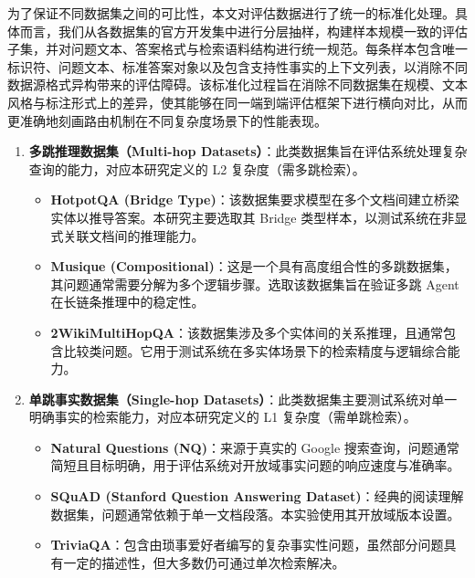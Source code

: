 为了保证不同数据集之间的可比性，本文对评估数据进行了统一的标准化处理。具体而言，我们从各数据集的官方开发集中进行分层抽样，构建样本规模一致的评估子集，并对问题文本、答案格式与检索语料结构进行统一规范。每条样本包含唯一标识符、问题文本、标准答案对象以及包含支持性事实的上下文列表，以消除不同数据源格式异构带来的评估障碍。该标准化过程旨在消除不同数据集在规模、文本风格与标注形式上的差异，使其能够在同一端到端评估框架下进行横向对比，从而更准确地刻画路由机制在不同复杂度场景下的性能表现。


\begin{enumerate}
\item \textbf{多跳推理数据集（Multi-hop Datasets）}：此类数据集旨在评估系统处理复杂查询的能力，对应本研究定义的 L2 复杂度（需多跳检索）。
\begin{itemize}
\item \textbf{HotpotQA (Bridge Type)}：该数据集要求模型在多个文档间建立桥梁实体以推导答案。本研究主要选取其 Bridge 类型样本，以测试系统在非显式关联文档间的推理能力。
\item \textbf{Musique (Compositional)}：这是一个具有高度组合性的多跳数据集，其问题通常需要分解为多个逻辑步骤。选取该数据集旨在验证多跳 Agent 在长链条推理中的稳定性。
\item \textbf{2WikiMultiHopQA}：该数据集涉及多个实体间的关系推理，且通常包含比较类问题。它用于测试系统在多实体场景下的检索精度与逻辑综合能力。
\end{itemize}
\item \textbf{单跳事实数据集（Single-hop Datasets）}：此类数据集主要测试系统对单一明确事实的检索能力，对应本研究定义的 L1 复杂度（需单跳检索）。
\begin{itemize}
    \item \textbf{Natural Questions (NQ)}：来源于真实的 Google 搜索查询，问题通常简短且目标明确，用于评估系统对开放域事实问题的响应速度与准确率。
    \item \textbf{SQuAD (Stanford Question Answering Dataset)}：经典的阅读理解数据集，问题通常依赖于单一文档段落。本实验使用其开放域版本设置。
    \item \textbf{TriviaQA}：包含由琐事爱好者编写的复杂事实性问题，虽然部分问题具有一定的描述性，但大多数仍可通过单次检索解决。
\end{itemize}

\end{enumerate}




